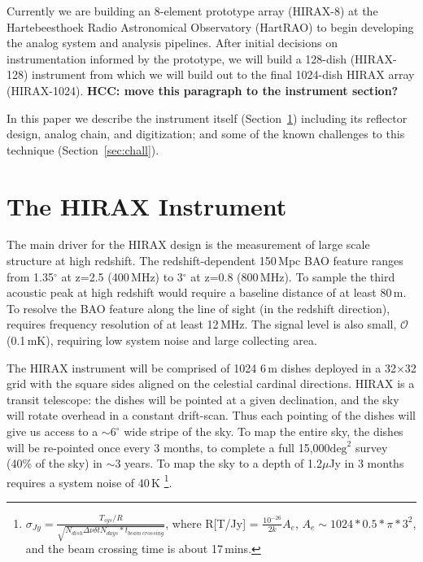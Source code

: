 \documentclass[]{spie}  %
\begin{document}
Currently we are building an 8-element prototype array (HIRAX-8) at the Hartebeesthoek Radio Astronomical Observatory (HartRAO) to begin developing the analog system and analysis pipelines. After initial decisions on instrumentation informed by the prototype, we will build a 128-dish (HIRAX-128) instrument from which we will build out to the final 1024-dish HIRAX array (HIRAX-1024). {\bf HCC: move this paragraph to the instrument section?} \newline

In this paper we describe the instrument itself (Section~\ref{sec:instru}) including its reflector design, analog chain, and digitization; and some of the known challenges to this technique (Section~\ref{sec:chall}).


\section{The HIRAX Instrument}
\label{sec:instru}

The main driver for the HIRAX design is the measurement of large scale structure at high redshift. The redshift-dependent 150\,Mpc BAO feature ranges from 1.35$^{\circ}$ at z=2.5 (400\,MHz) to 3$^{\circ}$ at z=0.8 (800\,MHz). To sample the third acoustic peak at high redshift would require a baseline distance of at least 80\,m. To resolve the BAO feature along the line of sight (in the redshift direction), requires frequency resolution of at least 12\,MHz. The signal level is also small, $\mathcal{O}$(0.1\,mK), requiring low system noise and large collecting area. \newline 

The HIRAX instrument will be comprised of 1024 6\,m dishes deployed in a 32$\times$32 grid with the square sides aligned on the celestial cardinal directions. HIRAX is a transit telescope: the dishes will be pointed at a given declination, and the sky will rotate overhead in a constant drift-scan. Thus each pointing of the dishes will give us access to a $\sim6^{\circ}$ wide stripe of the sky. To map the entire sky, the dishes will be re-pointed once every 3 months, to complete a full 15,000$\mathrm{deg}^{2}$ survey (40\% of the sky) in $\sim$3 years. To map the sky to a depth of 1.2$\mu$Jy in 3 months requires a system noise of 40\,K \footnote {$\sigma_{Jy} = \frac{T_{sys} / R }{\sqrt{N_{dish} \Delta\nu \delta t N_{days}*t_{beam~crossing}}}$, where R[T/Jy] = $\frac{10^{-26}}{2k}A_{e}$, $A_{e}\sim1024*0.5*\pi*3^{2}$, and the beam crossing time is about 17\,mins. }. 
\newline
\end{document}

